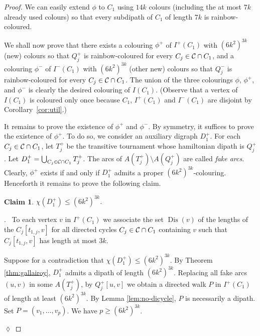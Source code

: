 \documentclass[utf8,10pt]{article}
\theoremstyle{plain}
\newtheorem{claim}{Claim}[theorem]
\theoremstyle{definition}
\theoremstyle{remark}
\newenvironment{subproof}{\par\noindent {\it Subproof}.\ }{\hfill$\lozenge$\par\vspace{11pt}}
\newcommand{\col}{(6k^2)^{3k}}
\DeclareMathOperator{\Dis}{Dis}
\begin{document}
\begin{proof}
We can easily extend $\phi$ to $C_1$ using $14k$ colours (including the at most $7k$ already used colours)
so that every subdipath of $C_1$ of length $7k$ is rainbow-coloured.

We shall now prove that there exists a colouring $\phi^+$ of $I^+(C_1)$ with $\col$ (new) colours so that $Q^+_j$ is rainbow-coloured for every $C_j\in {\cal C}\cap C_1$, and a colouring $\phi^-$ of $I^-(C_1)$ with $\col$ (other new) colours so that $Q^-_j$ is rainbow-coloured for every $C_j\in {\cal C}\cap C_1$.
The union of the three colourings $\phi$, $\phi^+$, and $\phi^-$ is clearly the desired colouring of $I(C_1)$. (Observe that a vertex of $I(C_1)$ is coloured only once because  $C_1$, $I^+(C_1)$ and $I^-(C_1)$ are disjoint by Corollary~\ref{cor:util}.)

\smallskip

It remains to prove the existence of $\phi^+$ and $\phi^-$. By symmetry, it suffices to prove the existence of $\phi^+$.
 To do so, we consider an auxiliary digraph $D^+_1$.
 For each $C_j\in {\cal C}\cap C_1$, let $T^+_j$ be the transitive tournament whose hamiltonian dipath is $Q^+_j$.
Let $D^+_1=\bigcup_{C_j\in  {\cal C}\cap C_1} T^+_j$. 
The arcs of $A(T^+_j)\setminus A(Q^+_j)$ are called {\it fake arcs}.
Clearly, $\phi^+$ exists if and only if $D^+_1$ admits a proper $\col$-colouring. Henceforth it remains to prove the following claim.

\begin{claim}\label{claim:c+}
$\chi(D^+_1) \leq  \col$.
\end{claim}

\begin{subproof}
To each vertex $v$ in $I^+(C_1)$ we associate the set $\Dis(v)$ of the lengths of the $C_j[t_{1,j},v]$ for all directed cycles $C_j\in {\cal C} \cap C_1$ containing $v$ such that $C_j[t_{1,j},v]$ has length at most $3k$.


Suppose for a contradiction that $\chi(D^+_1) \leq  \col$.
By Theorem \ref{thm:gallairoy}, $D^+_1$ admits a dipath of length $\col$. Replacing all fake arcs  $(u,v)$ in some $A(T^+_j)$, by 
$Q^+_j[u,v]$ we obtain a directed walk $P$ in $I^+(C_1)$ of length at least $\col$. By Lemma \ref{lem:no-dicycle}, $P$ is necessarily a dipath. Set $P=(v_1,  \dots , v_{p})$. We have $p\geq \col$.


\end{subproof}
\end{proof}
\end{document}
